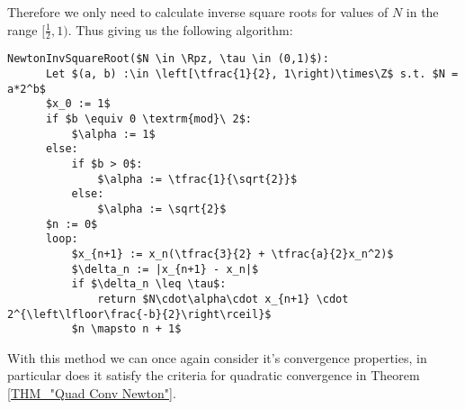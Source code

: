 Therefore we only need to calculate inverse square roots for values of \(N\) in the range \([\tfrac{1}{2}, 1)\). Thus giving us the following algorithm:\\

\begin{lstlisting}[frame=single,mathescape,caption={Newton Inverse Square Root Method},label={PCD_"Newton Inverse Square Root"}]
  NewtonInvSquareRoot($N \in \Rpz, \tau \in (0,1)$):
      Let $(a, b) :\in \left[\tfrac{1}{2}, 1\right)\times\Z$ s.t. $N = a*2^b$
      $x_0 := 1$
      if $b \equiv 0 \textrm{mod}\ 2$:
          $\alpha := 1$
      else:
          if $b > 0$:
              $\alpha := \tfrac{1}{\sqrt{2}}$
          else:
              $\alpha := \sqrt{2}$
      $n := 0$
      loop:
          $x_{n+1} := x_n(\tfrac{3}{2} + \tfrac{a}{2}x_n^2)$
          $\delta_n := |x_{n+1} - x_n|$
          if $\delta_n \leq \tau$:
              return $N\cdot\alpha\cdot x_{n+1} \cdot 2^{\left\lfloor\frac{-b}{2}\right\rceil}$
          $n \mapsto n + 1$
\end{lstlisting}

With this method we can once again consider it's convergence properties, in particular does it satisfy the criteria for quadratic convergence in Theorem \ref{THM_"Quad Conv Newton"}.

